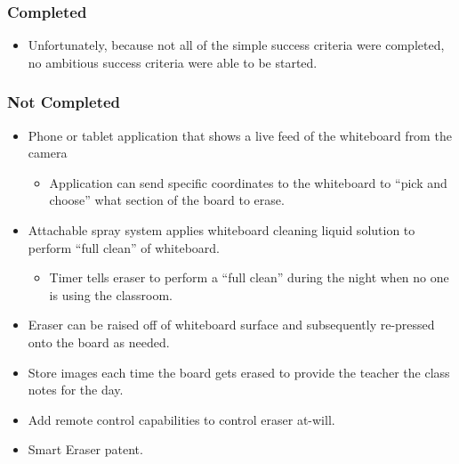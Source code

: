 \subsubsection{Completed}
\begin{itemize}
	\item Unfortunately, because not all of the simple success criteria were completed, no ambitious success criteria were able to be started.\\
\end{itemize}
\subsubsection{Not Completed}
 \begin{itemize}
 	\item Phone or tablet application that shows a live feed of the whiteboard from the camera
 		\begin{itemize}
 		\item Application can send specific coordinates to the whiteboard to ``pick and choose'' what section of the board to erase.
 		\end{itemize}
 	\item Attachable spray system applies whiteboard cleaning liquid solution to perform ``full clean'' of whiteboard.
 		\begin{itemize}
		\item Timer tells eraser to perform a ``full clean'' during the night when no one is using the classroom.
		\end{itemize}
 	\item Eraser can be raised off of whiteboard surface and subsequently re-pressed onto the board as needed.
 	\item Store images each time the board gets erased to provide the teacher the class notes for the day.
 	\item Add remote control capabilities to control eraser at-will.
 	\item Smart Eraser patent.
 \end{itemize}

